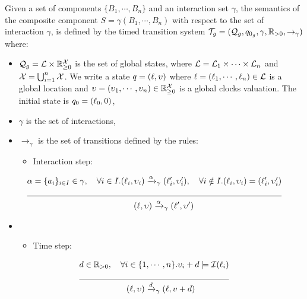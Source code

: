\begin{property}\label{pr:sem_comp}
  Given a set of components $\{B_1,\cdots,B_n\}$ and an interaction set $\gamma$,
  the semantics of the composite component $S=\gamma(B_1,\cdots,B_n)$
  with respect to the set of interaction $\gamma$, is defined by 
  the timed transition system $\mathcal{T}_g=(\mathcal{Q}_g,q_{0_g},\gamma,\mathbb{R}_{> 0},\to_{\gamma})$ where:
  \begin{itemize}
    \item $\mathcal{Q}_g=\mathcal{L}\times\mathbb{R}_{\ge 0}^{\mathcal{X}}$ is the set of global states, where
      $\mathcal{L}=\mathcal{L}_1\times\cdots\times\mathcal{L}_n$ and $\mathcal{X}=\bigcup_{i=1}^n\mathcal{X}$.
      We write a state $q=(\ell,\upsilon)$ where $\ell=(\ell_1,\cdots,\ell_n)\in\mathcal{L}$
      is a global location and $\upsilon=(\upsilon_1,\cdots,\upsilon_n)\in\mathbb{R}_{\ge 0}^{\mathcal{X}}$ is a global 
      clocks valuation. The initial state is $q_0=(\ell_0,0)$,
    \item $\gamma$ is the set of interactions,
    \item $\to_{\gamma}$ is the set of transitions defined by the rules:
    \begin{itemize}
      \item Interaction step: \\
      \end{itemize}
  \end{itemize}
  \vspace*{-1cm}
  \begin{align*}
    & \alpha=\{a_i\}_{i\in I}\in\gamma,\quad\forall i\in{I}.(\loc_i,\val_i)
    \transitb{\alpha}{\gamma}(\loc'_i,\val'_i),\quad\forall i\notin{I}.
    (\loc_i,\val_i)=(\loc'_i,\val'_i)\\
    \cline{1-2}
   &\hspace{4.5cm}(\loc,\val)\transitb{\alpha}{\gamma}(\loc',\val')
 \end{align*}
  \vspace*{-1.5cm}
  \begin{itemize}
    \item[] 
      \begin{itemize}
      \item Time step:
    \end{itemize}
  \end{itemize}
  \vspace*{-5mm}
  \begin{align*}
    & d\in\realpos,\quad\forall i\in\{1,\cdots,n\}
    .\val_i+d\models\Inv{\loc_i}\\
    \cline{1-2}
   &\hspace{2cm}(\loc,\val)\transitb{d}{\gamma}(\loc,\val+d)
 \end{align*}
\end{property}

